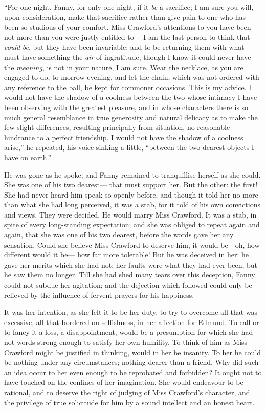 ``For one night, Fanny, for only one night, if it \emph{be}
a sacrifice; I am sure you will, upon consideration,
make that sacrifice rather than give pain to one who has been
so studious of your comfort.  Miss Crawford's attentions
to you have been---not more than you were justly entitled to---%
I am the last person to think that \emph{could} \emph{be},
but they have been invariable; and to be returning them
with what must have something the \emph{air} of ingratitude,
though I know it could never have the \emph{meaning}, is not
in your nature, I am sure.  Wear the necklace, as you
are engaged to do, to-morrow evening, and let the chain,
which was not ordered with any reference to the ball,
be kept for commoner occasions.  This is my advice.
I would not have the shadow of a coolness between the two whose
intimacy I have been observing with the greatest pleasure,
and in whose characters there is so much general resemblance
in true generosity and natural delicacy as to make the few
slight differences, resulting principally from situation,
no reasonable hindrance to a perfect friendship.  I would
not have the shadow of a coolness arise,'' he repeated,
his voice sinking a little, ``between the two dearest objects
I have on earth.''

He was gone as he spoke; and Fanny remained to tranquillise
herself as she could.  She was one of his two dearest---%
that must support her.  But the other:  the first!
She had never heard him speak so openly before, and though
it told her no more than what she had long perceived,
it was a stab, for it told of his own convictions and views.
They were decided.  He would marry Miss Crawford.
It was a stab, in spite of every long-standing expectation;
and she was obliged to repeat again and again, that she
was one of his two dearest, before the words gave
her any sensation.  Could she believe Miss Crawford to
deserve him, it would be---oh, how different would it be---%
how far more tolerable!  But he was deceived in her:
he gave her merits which she had not; her faults were
what they had ever been, but he saw them no longer.
Till she had shed many tears over this deception,
Fanny could not subdue her agitation; and the dejection
which followed could only be relieved by the influence of
fervent prayers for his happiness.

It was her intention, as she felt it to be her duty,
to try to overcome all that was excessive, all that
bordered on selfishness, in her affection for Edmund.
To call or to fancy it a loss, a disappointment, would be
a presumption for which she had not words strong enough to
satisfy her own humility.  To think of him as Miss Crawford
might be justified in thinking, would in her be insanity.
To her he could be nothing under any circumstances;
nothing dearer than a friend.  Why did such an idea occur
to her even enough to be reprobated and forbidden?  It ought
not to have touched on the confines of her imagination.
She would endeavour to be rational, and to deserve
the right of judging of Miss Crawford's character,
and the privilege of true solicitude for him by a sound
intellect and an honest heart.

